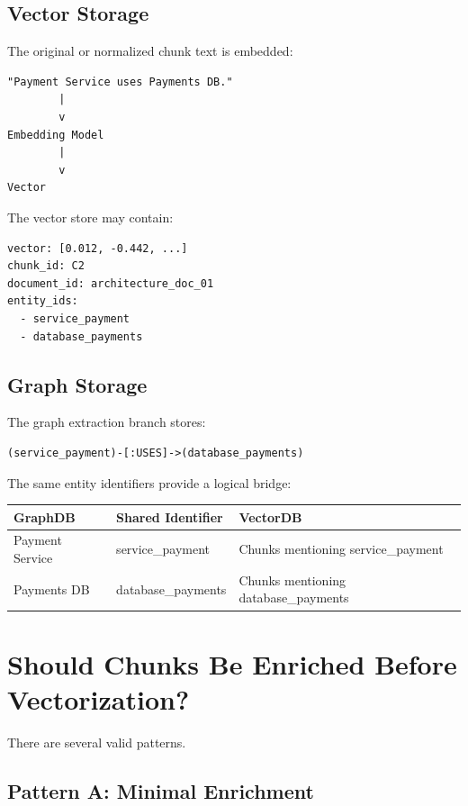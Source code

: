 \documentclass[11pt,a4paper]{article}
\begin{document}
\subsection{Vector Storage}

The original or normalized chunk text is embedded:

\begin{lstlisting}
"Payment Service uses Payments DB."
        |
        v
Embedding Model
        |
        v
Vector
\end{lstlisting}

The vector store may contain:

\begin{lstlisting}
vector: [0.012, -0.442, ...]
chunk_id: C2
document_id: architecture_doc_01
entity_ids:
  - service_payment
  - database_payments
\end{lstlisting}

\subsection{Graph Storage}

The graph extraction branch stores:

\begin{lstlisting}
(service_payment)-[:USES]->(database_payments)
\end{lstlisting}

The same entity identifiers provide a logical bridge:

\begin{center}
\begin{tabular}{lll}
\toprule
GraphDB & Shared Identifier & VectorDB \\
\midrule
Payment Service & service\_payment & Chunks mentioning service\_payment \\
Payments DB & database\_payments & Chunks mentioning database\_payments \\
\bottomrule
\end{tabular}
\end{center}

\section{Should Chunks Be Enriched Before Vectorization?}

There are several valid patterns.

\subsection{Pattern A: Minimal Enrichment}
\end{document}
